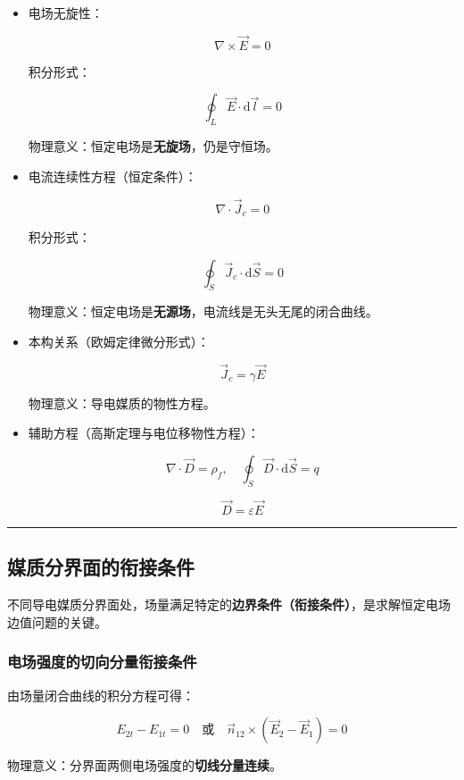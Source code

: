 \begin{itemize}
    \item 电场无旋性：
    \begin{formulaBox}
    \[
    \nabla \times \vec{E} = 0
    \]
    \end{formulaBox}
    积分形式：
    \begin{formulaBox}
    \[
    \oint_L \vec{E} \cdot \mathrm{d}\vec{l} = 0
    \]
    \end{formulaBox}
    物理意义：恒定电场是\textbf{无旋场}，仍是守恒场。

    \item 电流连续性方程（恒定条件）：
    \begin{formulaBox}
    \[
    \nabla \cdot \vec{J}_c = 0
    \]
    \end{formulaBox}
    积分形式：
    \begin{formulaBox}
    \[
    \oint_S \vec{J}_c \cdot \mathrm{d}\vec{S} = 0
    \]
    \end{formulaBox}
    物理意义：恒定电场是\textbf{无源场}，电流线是无头无尾的闭合曲线。

    \item 本构关系（欧姆定律微分形式）：
    \begin{formulaBox}
    \[
    \vec{J}_c = \gamma \vec{E}
    \]
    \end{formulaBox}
    物理意义：导电媒质的物性方程。

    \item 辅助方程（高斯定理与电位移物性方程）：
    \begin{formulaBox}
    \[
    \nabla \cdot \vec{D} = \rho_f, \quad \oint_S \vec{D} \cdot \mathrm{d}\vec{S} = q
    \]
    \end{formulaBox}
    \begin{formulaBox}
    \[
    \vec{D} = \varepsilon \vec{E}
    \]
    \end{formulaBox}
\end{itemize}

\vspace{0.8cm}\hrule\vspace{0.8cm}

\subsection{媒质分界面的衔接条件}
不同导电媒质分界面处，场量满足特定的\textbf{边界条件（衔接条件）}，是求解恒定电场边值问题的关键。

\subsubsection{电场强度的切向分量衔接条件}
由场量闭合曲线的积分方程可得：
\begin{formulaBox}
\[
E_{2t} - E_{1t} = 0 \quad \text{或} \quad \vec{n}_{12} \times (\vec{E}_2 - \vec{E}_1) = 0
\]
\end{formulaBox}
物理意义：分界面两侧电场强度的\textbf{切线分量连续}。

